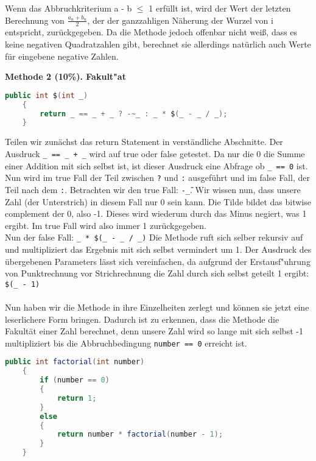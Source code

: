 \documentclass{pi1}
\begin{document}
Wenn das Abbruchkriterium a - b $\leq$ 1 erfüllt ist, wird der Wert der letzten Berechnung von $\frac{a_n + b_n}{2}$, der der ganzzahligen Näherung der Wurzel von i entspricht, zurückgegeben.
Da die Methode jedoch offenbar nicht weiß, dass es keine negativen Quadratzahlen gibt, berechnet sie allerdings natürlich auch Werte für eingebene negative Zahlen.

\newpage

\textbf{Methode 2 (10\%). Fakult"at } 

\begin{lstlisting}[firstnumber=14, language=Java]
public int $(int _)
    {
        return _ == _ + _ ? -~_ : _ * $(_ - _ / _);
    }
\end{lstlisting}
Teilen wir zunächst das return Statement in verständliche Abschnitte. Der Ausdruck \texttt{\_ == \_ + \_} wird auf true oder false getestet. Da nur die 0 die Summe einer Addition mit sich selbst ist, ist dieser Ausdruck eine Abfrage ob \texttt{\_ == 0} ist.\\
Nun wird im true Fall der Teil zwischen \texttt{?} und \texttt{:} ausgeführt und im false Fall, der Teil nach dem  \texttt{:}. Betrachten wir den true Fall: \texttt{-\~\_}. Wir wissen nun, dass unsere Zahl (der Unterstrich) in diesem Fall nur 0 sein kann. Die Tilde bildet das bitwise complement der 0, also -1. Dieses wird wiederum durch das Minus negiert, was 1 ergibt. Im true Fall wird also immer 1 zurückgegeben.\\
Nun der false Fall: \texttt{\_ * \$(\_ - \_ / \_)} Die Methode ruft sich selber rekursiv auf und multipliziert das Ergebnis mit sich selbst vermindert um 1. Der Ausdruck des übergebenen Parameters lässt sich vereinfachen, da aufgrund der Erstausf"uhrung von Punktrechnung vor Strichrechnung die Zahl durch sich selbst geteilt 1 ergibt: \texttt{\$(\_ - 1)}\\
\\ Nun haben wir die Methode in ihre Einzelheiten zerlegt und können sie jetzt eine leserlichere Form bringen. Dadurch ist zu erkennen, dass die Methode die Fakultät einer Zahl berechnet, denn unsere Zahl wird so lange mit sich selbst -1 multipliziert bis die Abbruchbedingung \texttt{number == 0} erreicht ist.


\begin{lstlisting}[caption={Methode factorial()}, firstnumber=65, language=Java]
public int factorial(int number)
    {
        if (number == 0)
        {
            return 1;
        }
        else
        {
            return number * factorial(number - 1);
        }
    }
\end{lstlisting}
\end{document}
